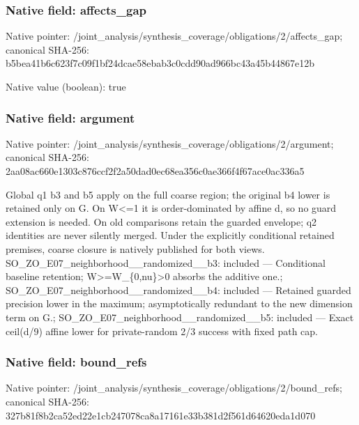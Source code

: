 \documentclass[10pt,a4paper]{article}
\begin{document}
\subsubsection{Native field: affects\_\allowbreak{}gap}
Native pointer: /joint\_\allowbreak{}analysis/synthesis\_\allowbreak{}coverage/obligations/2/affects\_\allowbreak{}gap; canonical SHA-256: b5bea41b6c623f7c09f1bf24dcae58ebab3c0cdd90ad966bc43a45b44867e12b

Native value (boolean): true

\subsubsection{Native field: argument}
Native pointer: /joint\_\allowbreak{}analysis/synthesis\_\allowbreak{}coverage/obligations/2/argument; canonical SHA-256: 2aa08ac660e1303c876ccf2f2a50dad0ec68ea356c0ae366f4f67ace0ac336a5

\begingroup\raggedright\sloppy Global q1 b3 and b5 apply on the full coarse region;\allowbreak{} the original b4 lower is retained only on G. On W<=\allowbreak{}1 it is order-dominated by affine d,\allowbreak{} so no guard extension is needed. On old comparisons retain the guarded envelope;\allowbreak{} q2 identities are never silently merged. Under the explicitly conditional retained premises,\allowbreak{} coarse closure is natively published for both views. SO\_\allowbreak{}ZO\_\allowbreak{}E07\_\allowbreak{}neighborhood\_\allowbreak{}\_\allowbreak{}randomized\_\allowbreak{}\_\allowbreak{}b3:\allowbreak{} included {\AtlasUnicodeText —}\allowbreak{} Conditional baseline retention;\allowbreak{} W>=\allowbreak{}W\_\allowbreak{}\{0,\allowbreak{}nu\}>0 absorbs the additive one.;\allowbreak{} SO\_\allowbreak{}ZO\_\allowbreak{}E07\_\allowbreak{}neighborhood\_\allowbreak{}\_\allowbreak{}randomized\_\allowbreak{}\_\allowbreak{}b4:\allowbreak{} included {\AtlasUnicodeText —}\allowbreak{} Retained guarded precision lower in the maximum;\allowbreak{} asymptotically redundant to the new dimension term on G.;\allowbreak{} SO\_\allowbreak{}ZO\_\allowbreak{}E07\_\allowbreak{}neighborhood\_\allowbreak{}\_\allowbreak{}randomized\_\allowbreak{}\_\allowbreak{}b5:\allowbreak{} included {\AtlasUnicodeText —}\allowbreak{} Exact ceil(d/\allowbreak{}9) affine lower for private-random 2/\allowbreak{}3 success with fixed path cap.\par\endgroup

\subsubsection{Native field: bound\_\allowbreak{}refs}
Native pointer: /joint\_\allowbreak{}analysis/synthesis\_\allowbreak{}coverage/obligations/2/bound\_\allowbreak{}refs; canonical SHA-256: 327b81f8b2ca52ed22e1cb247078ca8a17161e33b381d2f561d64620eda1d070
\end{document}
